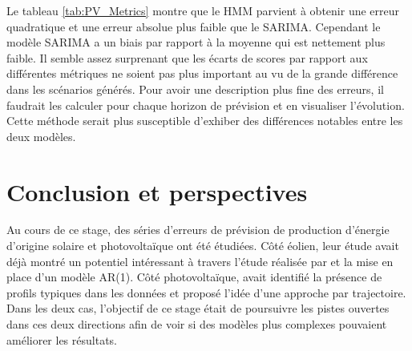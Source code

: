 \documentclass[12pt, french]{report}
\begin{document}
Le tableau \ref{tab:PV_Metrics} montre que le HMM parvient à obtenir une erreur quadratique et une erreur absolue plus faible que le SARIMA. Cependant le modèle SARIMA a un biais par rapport à la moyenne qui est nettement plus faible. Il semble assez surprenant que les écarts de scores par rapport aux différentes métriques ne soient pas plus important au vu de la grande différence dans les scénarios générés. Pour avoir une description plus fine des erreurs, il faudrait les calculer pour chaque horizon de prévision et en visualiser l'évolution. Cette méthode serait plus susceptible d'exhiber des différences notables entre les deux modèles. 










\chapter{Conclusion et perspectives}
Au cours de ce stage, des séries d'erreurs de prévision de production d'énergie d'origine solaire et photovoltaïque ont été étudiées. Côté éolien, leur étude avait déjà montré un potentiel intéressant à travers l'étude réalisée par \cite{haessig_dimensionnement_2014} et la mise en place d'un modèle AR(1). Côté photovoltaïque, \cite{latimier_gestion_2016} avait identifié la présence de profils typiques dans les données et proposé l'idée d'une approche par trajectoire. Dans les deux cas, l'objectif de ce stage était de poursuivre les pistes ouvertes dans ces deux directions afin de voir si des modèles plus complexes pouvaient améliorer les résultats.
\end{document}
